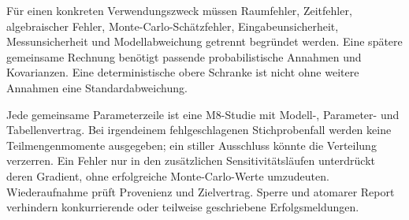 Für einen konkreten Verwendungszweck müssen Raumfehler, Zeitfehler,
algebraischer Fehler, Monte-Carlo-Schätzfehler, Eingabeunsicherheit,
Messunsicherheit und Modellabweichung getrennt begründet werden.
Eine spätere gemeinsame Rechnung benötigt passende probabilistische Annahmen
und Kovarianzen. Eine deterministische obere Schranke ist nicht ohne weitere
Annahmen eine Standardabweichung.

Jede gemeinsame Parameterzeile ist eine M8-Studie mit Modell-, Parameter-
und Tabellenvertrag. Bei irgendeinem fehlgeschlagenen Stichprobenfall werden
keine Teilmengenmomente ausgegeben; ein stiller Ausschluss könnte die Verteilung
verzerren. Ein Fehler nur in den zusätzlichen Sensitivitätsläufen unterdrückt
deren Gradient, ohne erfolgreiche Monte-Carlo-Werte umzudeuten.
Wiederaufnahme prüft Provenienz und Zielvertrag. Sperre und atomarer Report
verhindern konkurrierende oder teilweise geschriebene Erfolgsmeldungen.
